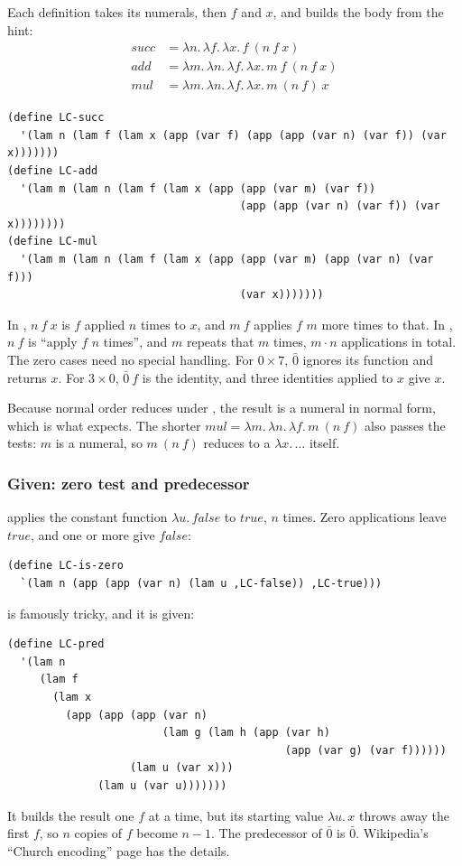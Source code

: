 \begin{solution}
Each definition takes its numerals, then $f$ and $x$, and builds the body from the hint:
\begin{align*}
\mathit{succ} &= \lambda n.\, \lambda f.\, \lambda x.\, f\ (n\ f\ x) \\
\mathit{add} &= \lambda m.\, \lambda n.\, \lambda f.\, \lambda x.\, m\ f\ (n\ f\ x) \\
\mathit{mul} &= \lambda m.\, \lambda n.\, \lambda f.\, \lambda x.\, m\ (n\ f)\ x
\end{align*}
\begin{lstlisting}
(define LC-succ
  '(lam n (lam f (lam x (app (var f) (app (app (var n) (var f)) (var x)))))))
(define LC-add
  '(lam m (lam n (lam f (lam x (app (app (var m) (var f))
                                    (app (app (var n) (var f)) (var x))))))))
(define LC-mul
  '(lam m (lam n (lam f (lam x (app (app (var m) (app (var n) (var f)))
                                    (var x)))))))
\end{lstlisting}
In , $n\ f\ x$ is $f$ applied $n$ times to $x$, and $m\ f$ applies $f$ $m$ more times to that. In , $n\ f$ is ``apply $f$ $n$ times'', and $m$ repeats that $m$ times, $m \cdot n$ applications in total. The zero cases need no special handling. For $0 \times 7$, $\bar 0$ ignores its function and returns $x$. For $3 \times 0$, $\bar 0\ f$ is the identity, and three identities applied to $x$ give $x$.

Because normal order reduces under , the result is a numeral in normal form, which is what  expects. The shorter $\mathit{mul} = \lambda m.\, \lambda n.\, \lambda f.\, m\ (n\ f)$ also passes the tests: $m$ is a numeral, so $m\ (n\ f)$ reduces to a $\lambda x.\, \dots$ itself.
\end{solution}

\subsubsection{Given: zero test and predecessor}  applies the constant function $\lambda u.\, \mathit{false}$ to $\mathit{true}$, $n$ times. Zero applications leave $\mathit{true}$, and one or more give $\mathit{false}$:
\begin{lstlisting}
(define LC-is-zero
  `(lam n (app (app (var n) (lam u ,LC-false)) ,LC-true)))
\end{lstlisting}

 is famously tricky, and it is given:
\begin{lstlisting}
(define LC-pred
  '(lam n
     (lam f
       (lam x
         (app (app (app (var n)
                        (lam g (lam h (app (var h)
                                           (app (var g) (var f))))))
                   (lam u (var x)))
              (lam u (var u)))))))
\end{lstlisting}
It builds the result one $f$ at a time, but its starting value $\lambda u.\, x$ throws away the first $f$, so $n$ copies of $f$ become $n - 1$. The predecessor of $\bar 0$ is $\bar 0$. Wikipedia's ``Church encoding'' page has the details.

